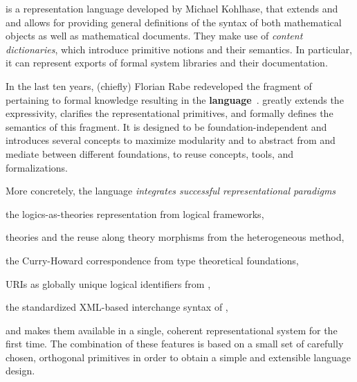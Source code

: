 \textbf{\omdoc} \cite{Kohlhase:old13} is a representation language developed by Michael Kohlhase, that extends \openmath and \mathml and allows for providing general definitions of the syntax of both mathematical objects as well as mathematical documents. They make use of \emph{content dictionaries}, which introduce primitive notions and their semantics. In particular, it can represent exports of formal system libraries and their documentation.

In the last ten years, (chiefly) Florian Rabe redeveloped the fragment of \omdoc pertaining to formal knowledge resulting in the \textbf{\ommt
language}~\cite{RK:mmt:10,HKR:extending:12,rabe:howto:14}.
\ommt greatly extends the expressivity, clarifies the representational primitives, and formally defines the semantics of this \omdoc fragment. It is designed to be foundation-independent and introduces several concepts to maximize modularity and to abstract from and mediate between different
foundations, to reuse concepts, tools, and formalizations.

More concretely, the \ommt language \emph{integrates successful representational paradigms}
\begin{compactitem}
\item the logics-as-theories representation from logical frameworks,
\item theories and the reuse along theory morphisms from the heterogeneous method,
\item the Curry-Howard correspondence from type theoretical foundations,
\item URIs as globally unique logical identifiers from \openmath,
\item the standardized XML-based interchange syntax of \omdoc,
\end{compactitem}
and makes them available in a single, coherent representational system for the first time.
The combination of these features is based on a small set of carefully chosen, orthogonal primitives in order to obtain a simple and extensible language design.

